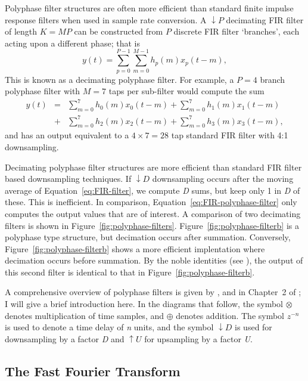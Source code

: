 \documentclass{ws-rv961x669}
\begin{document}
Polyphase filter structures are often more efficient than standard finite impulse response filters when used in sample rate conversion. A $\downarrow P$ decimating FIR filter of length $K=MP$ can be constructed from $P$ discrete FIR filter `branches', each acting upon a different phase; that is
\begin{equation}
y(t)=\sum_{p=0}^{P-1}\sum_{m=0}^{M-1}h_{p}(m)x_{p}(t-m),\label{eq:FIR-polyphase-filter}
\end{equation}
This is known as a decimating polyphase filter. For example, a $P=\mbox{4}$ branch polyphase filter with $M=\mbox{7}$ taps per sub-filter would compute the sum
\begin{eqnarray}
y(t) & = & \sum_{m=0}^{7}h_{0}(m)x_{0}(t-m)+\sum_{m=0}^{7}h_{1}(m)x_{1}(t-m)\nonumber \\
 & + & \sum_{m=0}^{7}h_{2}(m)x_{2}(t-m)+\sum_{m=0}^{7}h_{3}(m)x_{3}(t-m),
\end{eqnarray}
and has an output equivalent to a $\mbox{4}\times\mbox{7}=\mbox{28}$ tap standard FIR filter with 4:1 downsampling. 

Decimating polyphase filter structures are more efficient than standard FIR filter based downsampling techniques. If $\downarrow D$ downsampling occurs after the moving average of Equation~\ref{eq:FIR-filter}, we compute \emph{D} sums, but keep only 1 in \emph{D} of these. This is inefficient. In comparison, Equation~\ref{eq:FIR-polyphase-filter} only computes the output values that are of interest. A comparison of two decimating filters is shown in Figure~\ref{fig:polyphase-filters}. Figure~\ref{fig:polyphase-filterb} is a polyphase type structure, but decimation occurs after summation. Conversely, Figure~\ref{fig:polyphase-filterb} shows a more efficient implentation where decimation occurs before summation. By the noble identities (see \citep{Vaidyanathan:1990p6127}), the output of this second filter is identical to that in Figure~\ref{fig:polyphase-filterb}.


A comprehensive overview of polyphase filters is given by \citet{Vaidyanathan:1990p6127}, and in Chapter~2 of \citet{BookHarrisMultirateDSP}; I will give a brief introduction here. In the diagrams that follow, the symbol $\otimes$ denotes multiplication of time samples, and $\oplus$ denotes addition. The symbol $z^{-n}$ is used to denote a time delay of \emph{n} units, and the symbol $\downarrow D$ is used for downsampling by a factor \emph{D} and $\uparrow U$ for upsampling by a factor \emph{U}.

\subsection{The Fast Fourier Transform}
\end{document}
